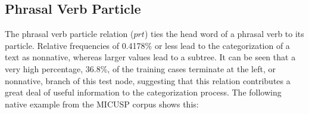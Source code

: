 \documentclass[main.tex]{subfiles}
\begin{document}

\subsection{Phrasal Verb Particle}

The phrasal verb particle relation ($prt$) ties the head word of a phrasal verb to its particle. Relative frequencies of 0.4178\% or less lead to the categorization of a text as nonnative, whereas larger values lead to a subtree. It can be seen that a very high percentage, 36.8\%, of the training cases terminate at the left, or nonnative, branch of this test node, suggesting that this relation contributes a great deal of useful information to the categorization process. The following native example from the MICUSP corpus shows this:
\newline\newline{}
\newline
\end{document}
